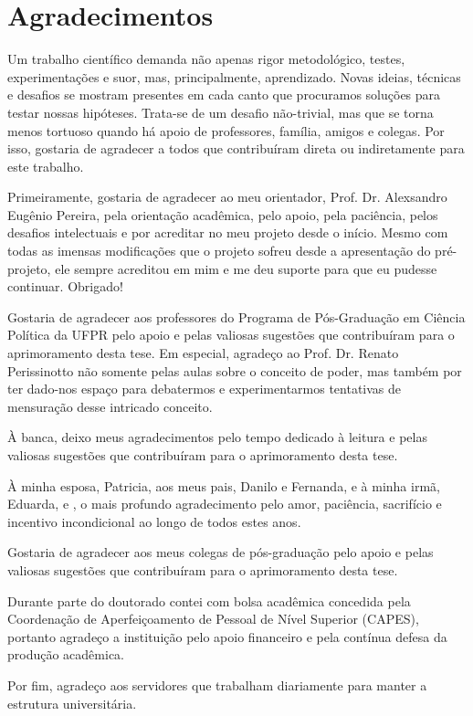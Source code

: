 \chapter*{Agradecimentos}

Um trabalho científico demanda não apenas rigor metodológico, testes, experimentações e suor, mas, principalmente, aprendizado. Novas ideias, técnicas e desafios se mostram presentes em cada canto que procuramos soluções para testar nossas hipóteses. Trata-se de um desafio não-trivial, mas que se torna menos tortuoso quando há apoio de professores, família, amigos e colegas. Por isso, gostaria de agradecer a todos que contribuíram direta ou indiretamente para este trabalho.

Primeiramente, gostaria de agradecer ao meu orientador, Prof. Dr. Alexsandro Eugênio Pereira, pela orientação acadêmica, pelo apoio, pela paciência, pelos desafios intelectuais e por acreditar no meu projeto desde o início. Mesmo com todas as imensas modificações que o projeto sofreu desde a apresentação do pré-projeto, ele sempre acreditou em mim e me deu suporte para que eu pudesse continuar. Obrigado!

Gostaria de agradecer aos professores do Programa de Pós-Graduação em Ciência Política da UFPR pelo apoio e pelas valiosas sugestões que contribuíram para o aprimoramento desta tese. Em especial, agradeço ao Prof. Dr. Renato Perissinotto não somente pelas aulas sobre o conceito de poder, mas também por ter dado-nos espaço para debatermos e experimentarmos tentativas de mensuração desse intricado conceito.

À banca, deixo meus agradecimentos pelo tempo dedicado à leitura e pelas valiosas sugestões que contribuíram para o aprimoramento desta tese.

À minha esposa, Patricia, aos meus pais, Danilo e Fernanda, e à minha irmã, Eduarda, e , o mais profundo agradecimento pelo amor, paciência, sacrifício e incentivo incondicional ao longo de todos estes anos.

Gostaria de agradecer aos meus colegas de pós-graduação pelo apoio e pelas valiosas sugestões que contribuíram para o aprimoramento desta tese.

Durante parte do doutorado contei com bolsa acadêmica concedida pela Coordenação de Aperfeiçoamento de Pessoal de Nível Superior (CAPES), portanto agradeço a instituição pelo apoio financeiro e pela contínua defesa da produção acadêmica.

Por fim, agradeço aos servidores que trabalham diariamente para manter a estrutura universitária.